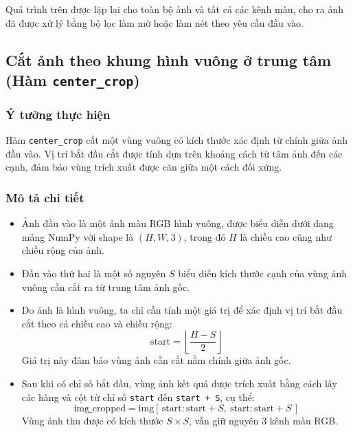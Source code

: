 Quá trình trên được lặp lại cho toàn bộ ảnh và tất cả các kênh màu, cho ra ảnh đã được xử lý bằng bộ lọc làm mờ hoặc làm nét theo yêu cầu đầu vào.


\subsection{Cắt ảnh theo khung hình vuông ở trung tâm (Hàm \texttt{center\_crop})}

\subsubsection*{Ý tưởng thực hiện}

Hàm \texttt{center\_crop} cắt một vùng vuông có kích thước xác định từ chính giữa ảnh đầu vào. Vị trí bắt đầu cắt được tính dựa trên khoảng cách từ tâm ảnh đến các cạnh, đảm bảo vùng trích xuất được căn giữa một cách đối xứng.

\subsubsection*{Mô tả chi tiết}

\begin{itemize}
  \item Ảnh đầu vào là một ảnh màu RGB hình vuông, được biểu diễn dưới dạng mảng NumPy với shape là \( (H, W, 3) \), trong đó \( H \) là chiều cao cũng như chiều rộng của ảnh.

  \item Đầu vào thứ hai là một số nguyên \( S \) biểu diễn kích thước cạnh của vùng ảnh vuông cần cắt ra từ trung tâm ảnh gốc.

  \item Do ảnh là hình vuông, ta chỉ cần tính một giá trị để xác định vị trí bắt đầu cắt theo cả chiều cao và chiều rộng:
        \[
          \text{start} = \left\lfloor \frac{H - S}{2} \right\rfloor
        \]
        Giá trị này đảm bảo vùng ảnh cần cắt nằm chính giữa ảnh gốc.

  \item Sau khi có chỉ số bắt đầu, vùng ảnh kết quả được trích xuất bằng cách lấy các hàng và cột từ chỉ số \texttt{start} đến \texttt{start + S}, cụ thể:
        \[
          \text{img\_cropped} = \text{img}[\, \text{start} : \text{start} + S,\ \text{start} : \text{start} + S\,]
        \]
        Vùng ảnh thu được có kích thước \( S \times S \), vẫn giữ nguyên 3 kênh màu RGB.
\end{itemize}

